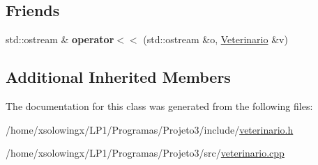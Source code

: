 \subsection*{Friends}
\begin{DoxyCompactItemize}
\item 
\mbox{\label{classVeterinario_a62553f6b0a0a3fdd3b7ac1e8b5a9d4d9}} 
std\+::ostream \& {\bfseries operator$<$$<$} (std\+::ostream \&o, \hyperlink{classVeterinario}{Veterinario} \&v)
\end{DoxyCompactItemize}
\subsection*{Additional Inherited Members}


The documentation for this class was generated from the following files\+:\begin{DoxyCompactItemize}
\item 
/home/xsolowingx/\+L\+P1/\+Programas/\+Projeto3/include/\hyperlink{veterinario_8h}{veterinario.\+h}\item 
/home/xsolowingx/\+L\+P1/\+Programas/\+Projeto3/src/\hyperlink{veterinario_8cpp}{veterinario.\+cpp}\end{DoxyCompactItemize}

